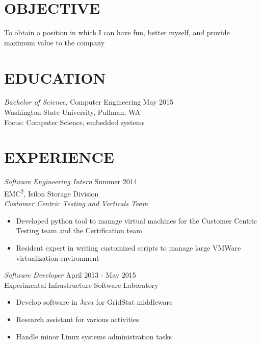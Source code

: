 \documentclass[line, margin]{res}
\begin{document}
\address{1455 NE Brandi Way Apt H203, Pullman, WA 99163}
\address{253-508-2725}

 
\begin{resume}
 
\section{OBJECTIVE}  To obtain a position in which I can have fun, better
				myself, and provide maximum value to the company 
 
\section{EDUCATION} {\sl Bachelor of Science,} Computer Engineering \hfill May 2015 \\
                Washington State University, Pullman, WA\\
                Focus: Computer Science, embedded systems
 
\section{EXPERIENCE} {\sl Software Engineering Intern} \hfill Summer 2014 \\
                EMC\textsuperscript{2}, Isilon Storage Division\\
                {\sl Customer Centric Testing and Verticals Team}
                 \begin{itemize}  \itemsep -2pt %
                 \item Developed python tool to manage virtual machines for the
                 Customer Centric Testing team and the Certification team
                \item Resident expert in writing customized scripts to manage large VMWare 
                virtualization environment
                \end{itemize}

                {\sl Software Developer} \hfill       April 2013 - May 2015 \\
                Experimental Infrastructure Software Laboratory
            \begin{itemize} \itemsep -2pt
                    \item Develop software in Java for GridStat middleware
                    \item Research assistant for various activities
                    \item Handle minor Linux systems administration tasks
                \end{itemize}
 

\end{resume}
\end{document}
